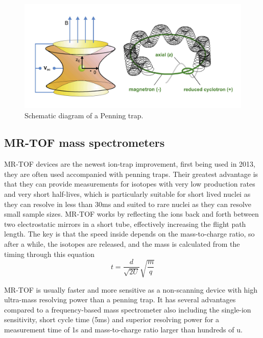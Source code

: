 \begin{figure}[H]
    \centering
    \includegraphics[width=.4\textwidth]{images/MS_penningtrap.png}
    \caption{Schematic diagram of a Penning trap.}\label{fig:MS_PT}
\end{figure}

\subsection{MR-TOF mass spectrometers}
MR-TOF devices are the newest ion-trap improvement, first being used in 2013, they are often used accompanied with penning traps.
Their greatest advantage is that they can provide measurements for isotopes with very low production rates and very short half-lives, which is particularly suitable for short lived nuclei as they can resolve in less than 30ms and suited to rare nuclei as they can resolve small sample sizes.
MR-TOF works by reflecting the ions back and forth between two electrostatic mirrors in a short tube, effectively increasing the flight path length.
The key is that the speed inside depends on the mass-to-charge ratio, so after a while, the isotopes are released, and the mass is calculated from the timing through this equation
\begin{equation}
    t = \frac{d}{\sqrt{2U}}\sqrt{\frac{m}{q}}
\end{equation}

MR-TOF is usually faster and more sensitive as a non-scanning device with high ultra-mass resolving power than a penning trap.
It has several advantages compared to a frequency-based mass spectrometer also including the single-ion sensitivity, short cycle time (5ms) and superior resolving power for a measurement time of 1s and mass-to-charge ratio larger than hundreds of u. \cite{dickel_multiple-reflection_2013}
